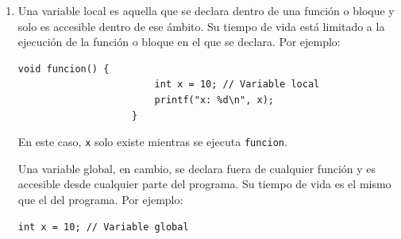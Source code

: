 \documentclass[12pt]{article}
\begin{document}
\begin{enumerate}
\begin{enumerate}[label*=\arabic*.]
\begin{lstlisting}[xleftmargin=-12.1em, inputencoding=utf8]
                    int main() {
                        int a = 5;
                        incrementar(a);
                        printf("El valor de a es: %d\n", a); // Imprime 5
                        return 0;
                    }
                \end{lstlisting}
                En este caso, el valor de \lstinline[language=C]|a| no cambia porque se pasa una copia de su valor a la función.

                En el paso por referencia, se pasa la dirección de memoria de la variable al argumento de la función. Esto permite que la función modifique directamente el valor de la variable original. Por ejemplo:
                \begin{lstlisting}[xleftmargin=-12.1em, inputencoding=utf8]
                    void incrementar(int *x) {
                        *x = *x + 1;
                    }

                    int main() {
                        int a = 5;
                        incrementar(&a);
                        printf("El valor de a es: %d\n", a); // Imprime 6
                        return 0;
                    }
                \end{lstlisting}
                En este caso, el valor de \lstinline[language=C]|a| cambia porque se pasa su dirección de memoria a la función.

                \item Una variable local es aquella que se declara dentro de una función o bloque y solo es accesible dentro de ese ámbito. Su tiempo de vida está limitado a la ejecución de la función o bloque en el que se declara. Por ejemplo:
                \begin{lstlisting}[xleftmargin=-12.1em, inputencoding=utf8]
                    void funcion() {
                        int x = 10; // Variable local
                        printf("x: %d\n", x);
                    }
                \end{lstlisting}
                En este caso, \lstinline[language=C]|x| solo existe mientras se ejecuta \lstinline[language=C]|funcion|.

                Una variable global, en cambio, se declara fuera de cualquier función y es accesible desde cualquier parte del programa. Su tiempo de vida es el mismo que el del programa. Por ejemplo:
                \begin{lstlisting}[xleftmargin=-12.1em, inputencoding=utf8]
                    int x = 10; // Variable global


\end{lstlisting}
\end{enumerate}
\end{enumerate}
\end{document}
